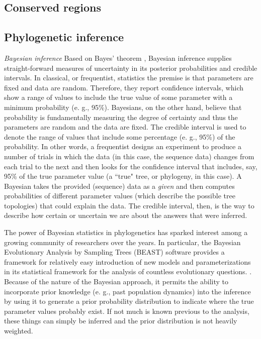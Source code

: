 \documentclass[10pt,letterpaper]{article}
\begin{document}
\subsection*{Conserved regions}


\subsection*{Phylogenetic inference}

\textit{Bayesian inference}
Based on Bayes' theorem \cite{Bayes}, Bayesian inference supplies straight-forward measures of uncertainty in its posterior probabilities and credible intervals.  
In classical, or frequentist, statistics the premise is that parameters are fixed and data are random.  Therefore, they report confidence intervals, which show a range of values to include the true value of some parameter with a minimum probability (e. g., 95\%).
Bayesians, on the other hand, believe that probability is fundamentally measuring the degree of certainty and thus the parameters are random and the data are fixed. The credible interval is used to denote the range of values that include some percentage (e. g., 95\%) of the probability. \cite{ConfidenceInterval}
In other words, a frequentist designs an experiment to produce a number of trials in which the data (in this case, the sequence data) changes from each trial to the next and then looks for the confidence interval that includes, say, 95\% of the true parameter value (a ``true" tree, or phylogeny, in this case).  
A Bayesian takes the provided (sequence) data as a \textit{given} and then computes probabilities of different parameter values (which describe the possible tree topologies) that could explain the data.
The credible interval, then, is the way to describe how certain or uncertain we are about the answers that were inferred. \cite{PPinBayesianPhylogenetics}

The power of Bayesian statistics in phylogenetics has sparked interest among a growing community of researchers over the years. \cite{Huelsenbeck} \cite{HolderLewis} \cite{MammalRadiation} \cite{EarlyMammals} \cite{MissingData} \cite{SPREAD} \cite{MammalDiversification} \cite{SampledAncestors} \cite{Phylodynamics}
In particular, the Bayesian Evolutionary Analysis by Sampling Trees (BEAST) software provides a framework for relatively easy introduction of new models and parameterizations in its statistical framework for the analysis of countless evolutionary questions. \cite{BEAST} \cite{BEAST1point7} \cite{BEAST2}.
Because of the nature of the Bayesian approach, it permits the ability to incorporate prior knowledge (e. g., past population dynamics) into the inference by using it to generate a prior probability distribution to indicate where the true parameter values probably exist.  
If not much is known previous to the analysis, these things can simply be inferred and the prior distribution is not heavily weighted. \cite{MCMC}
\end{document}
